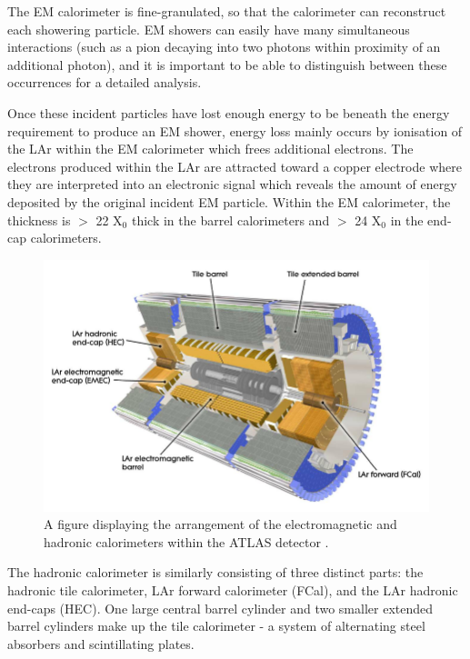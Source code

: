 \documentclass[12pt,a4paper,epsf,portrait,times,epsfig]{article}
\begin{document}
		The EM calorimeter is fine-granulated, so that the calorimeter can reconstruct each showering particle. EM showers can easily have many simultaneous interactions (such as a pion decaying into two photons within proximity of an additional photon), and it is important
		to be able to distinguish between these occurrences for a detailed analysis. \par
		
		Once these incident particles have lost enough energy to be beneath the energy requirement to produce an EM shower, energy loss mainly occurs by ionisation of the LAr within the EM calorimeter which frees additional electrons. The electrons produced within the LAr are attracted toward a copper electrode where they are interpreted into an electronic signal which reveals the amount of energy
		deposited by the original incident EM particle. Within the EM calorimeter, the thickness	is $>$ 22 X$_{0}$ thick in the barrel calorimeters and $>$ 24 X$_{0}$ in the end-cap calorimeters. \par
		
		\begin{figure}
			\centering
			\includegraphics[scale=0.4]{ATLAS_Calorimeters}
			\caption{A figure displaying the arrangement of the electromagnetic and hadronic calorimeters within the ATLAS detector \cite{Article:ATLASDesignPaper}.}
			\label{Fig:ATLASCalorimeters} 
		\end{figure} 
		
		The hadronic calorimeter is similarly consisting of three distinct parts: the hadronic tile calorimeter, LAr forward calorimeter (FCal), and the LAr hadronic end-caps (HEC). One large central barrel cylinder and two smaller extended barrel cylinders make up the tile calorimeter - a system of alternating steel absorbers and scintillating
		plates. \par
		
\end{document}
